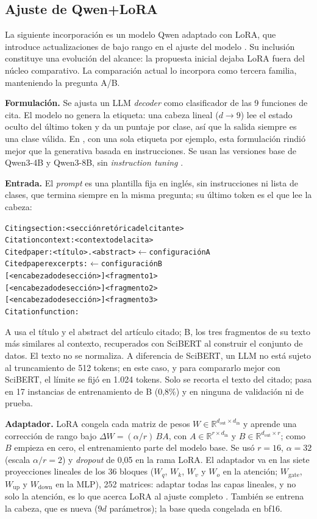 \documentclass[10pt,a4paper,twocolumn]{article}
\begin{document}
\subsection{Ajuste de Qwen+LoRA}
La siguiente incorporación es un modelo Qwen adaptado con LoRA, que introduce actualizaciones de bajo rango en el ajuste del modelo \cite{lora}. Su inclusión constituye una evolución del alcance: la propuesta inicial dejaba LoRA fuera del núcleo comparativo. La comparación actual lo incorpora como tercera familia, manteniendo la pregunta A/B.

\textbf{Formulación.} Se ajusta un LLM \emph{decoder} como clasificador de las 9 funciones de cita. El modelo no genera la etiqueta: una cabeza lineal ($d\to 9$) lee el estado oculto del último token y da un puntaje por clase, así que la salida siempre es una clase válida. En \cite{yousefiramandi}, con una sola etiqueta por ejemplo, esta formulación rindió mejor que la generativa basada en instrucciones. Se usan las versiones base de Qwen3-4B y Qwen3-8B, sin \emph{instruction tuning} \cite{qwen3}.

\textbf{Entrada.} El \emph{prompt} es una plantilla fija en inglés, sin instrucciones ni lista de clases, que termina siempre en la misma pregunta; su último token es el que lee la cabeza:
\begin{alltt}\footnotesize
Citing section: <sección retórica del citante>
Citation context: <contexto de la cita>
Cited paper: <título>. <abstract>   \(\leftarrow\) configuración A
Cited paper excerpts:               \(\leftarrow\) configuración B
[<encabezado de sección>] <fragmento 1>
[<encabezado de sección>] <fragmento 2>
[<encabezado de sección>] <fragmento 3>
Citation function:
\end{alltt}
A usa el título y el abstract del artículo citado; B, los tres fragmentos de su texto más similares al contexto, recuperados con SciBERT al construir el conjunto de datos. El texto no se normaliza. A diferencia de SciBERT, un LLM no está sujeto al truncamiento de 512 tokens; en este caso, y para compararlo mejor con SciBERT, el límite se fijó en 1.024 tokens. Solo se recorta el texto del citado; pasa en 17 instancias de entrenamiento de B (0,8\%) y en ninguna de validación ni de prueba.

\textbf{Adaptador.} LoRA \cite{lora} congela cada matriz de pesos $W\in\mathbb{R}^{d_\mathrm{out}\times d_\mathrm{in}}$ y aprende una corrección de rango bajo $\Delta W=(\alpha/r)\,BA$, con $A\in\mathbb{R}^{r\times d_\mathrm{in}}$ y $B\in\mathbb{R}^{d_\mathrm{out}\times r}$; como $B$ empieza en cero, el entrenamiento parte del modelo base. Se usó $r=16$, $\alpha=32$ (escala $\alpha/r=2$) y \emph{dropout} de 0,05 en la rama LoRA. El adaptador va en las siete proyecciones lineales de los 36 bloques ($W_q$, $W_k$, $W_v$ y $W_o$ en la atención; $W_\mathrm{gate}$, $W_\mathrm{up}$ y $W_\mathrm{down}$ en la MLP), 252 matrices: adaptar todas las capas lineales, y no solo la atención, es lo que acerca LoRA al ajuste completo \cite{schulman,qlora}. También se entrena la cabeza, que es nueva ($9d$ parámetros); la base queda congelada en bf16.
\end{document}

